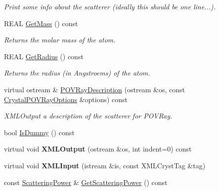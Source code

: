 \begin{DoxyCompactItemize}
\begin{DoxyCompactList}\small\item\em Print some info about the scatterer (ideally this should be one line...). \end{DoxyCompactList}\item 
R\+E\+AL \mbox{\hyperlink{class_obj_cryst_1_1_atom_a9fb77dee90fcd6bbcd199e6efa8e8c3c}{Get\+Mass}} () const
\begin{DoxyCompactList}\small\item\em Returns the molar mass of the atom. \end{DoxyCompactList}\item 
R\+E\+AL \mbox{\hyperlink{class_obj_cryst_1_1_atom_a5a985d3220fb8754f0db01ecde408bb9}{Get\+Radius}} () const
\begin{DoxyCompactList}\small\item\em Returns the radius (in Angstroems) of the atom. \end{DoxyCompactList}\item 
virtual ostream \& \mbox{\hyperlink{class_obj_cryst_1_1_atom_aaf6475195502fff91903f30b5c6c3345}{P\+O\+V\+Ray\+Description}} (ostream \&os, const \mbox{\hyperlink{struct_obj_cryst_1_1_crystal_p_o_v_ray_options}{Crystal\+P\+O\+V\+Ray\+Options}} \&options) const
\begin{DoxyCompactList}\small\item\em X\+M\+L\+Output a description of the scatterer for P\+O\+V\+Ray. \end{DoxyCompactList}\item 
bool \mbox{\hyperlink{class_obj_cryst_1_1_atom_a5f5aaf79fba4a85a0b2af58e817c3460}{Is\+Dummy}} () const
\item 
\mbox{\label{class_obj_cryst_1_1_atom_af4795b5a28e7c3a475ecbd20ced38c3a}} 
virtual void {\bfseries X\+M\+L\+Output} (ostream \&os, int indent=0) const
\item 
\mbox{\label{class_obj_cryst_1_1_atom_aec034b47e186b19cb0802aaa82c7ca3a}} 
virtual void {\bfseries X\+M\+L\+Input} (istream \&is, const X\+M\+L\+Cryst\+Tag \&tag)
\item 
\mbox{\label{class_obj_cryst_1_1_atom_ab4a0388c75cb7a51878199f1f86f6dac}} 
const \mbox{\hyperlink{class_obj_cryst_1_1_scattering_power}{Scattering\+Power}} \& \mbox{\hyperlink{class_obj_cryst_1_1_atom_ab4a0388c75cb7a51878199f1f86f6dac}{Get\+Scattering\+Power}} () const

\end{DoxyCompactItemize}

